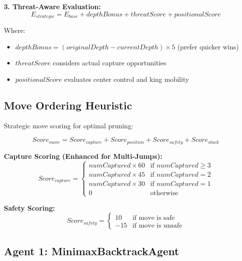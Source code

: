\documentclass[12pt,a4paper]{article}
\begin{document}
\textbf{3. Threat-Aware Evaluation:}
\begin{equation}
E_{strategic} = E_{base} + depthBonus + threatScore + positionalScore
\end{equation}

Where:
\begin{itemize}
    \item $depthBonus = (originalDepth - currentDepth) \times 5$ (prefer quicker wins)
    \item $threatScore$ considers actual capture opportunities
    \item $positionalScore$ evaluates center control and king mobility
\end{itemize}

\subsection{Move Ordering Heuristic}

Strategic move scoring for optimal pruning:

\begin{equation}
Score_{move} = Score_{capture} + Score_{position} + Score_{safety} + Score_{stack}
\end{equation}

\textbf{Capture Scoring (Enhanced for Multi-Jumps):}
\begin{equation}
Score_{capture} = \begin{cases}
numCaptured \times 60 & \text{if } numCaptured \geq 3 \\
numCaptured \times 45 & \text{if } numCaptured = 2 \\
numCaptured \times 30 & \text{if } numCaptured = 1 \\
0 & \text{otherwise}
\end{cases}
\end{equation}

\textbf{Safety Scoring:}
\begin{equation}
Score_{safety} = \begin{cases}
10 & \text{if move is safe} \\
-15 & \text{if move is unsafe}
\end{cases}
\end{equation}

\subsection{Agent 1: MinimaxBacktrackAgent}
\end{document}
